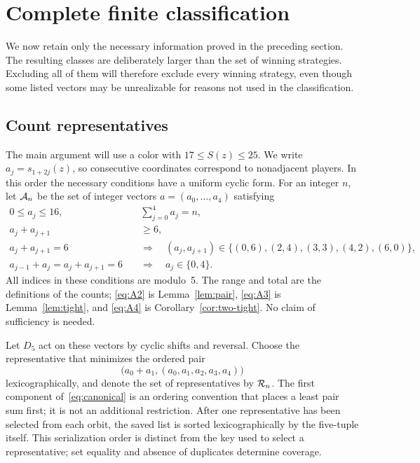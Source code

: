 \section{Complete finite classification}\label{sec:classification}
We now retain only the necessary information proved in the preceding
section. The resulting classes are deliberately larger than the set of
winning strategies. Excluding all of them will therefore exclude every
winning strategy, even though some listed vectors may be unrealizable
for reasons not used in the classification.
\subsection{Count representatives}
The main argument will use a color with $17\leq S(z)\leq25$.
We write $a_j=s_{1+2j}(z)$, so consecutive coordinates correspond to
nonadjacent players. In this order the necessary conditions have a uniform
cyclic form.
For an integer $n$, let $\mathcal{A}_n$ be the set of integer vectors
$a=(a_0,\ldots,a_4)$ satisfying
\begin{align}
0\leq a_j\leq16,\qquad&\sum_{j=0}^4a_j=n,\label{eq:A1}\\
a_j+a_{j+1}&\geq6,\label{eq:A2}\\
a_j+a_{j+1}=6\quad&\Longrightarrow\quad
(a_j,a_{j+1})\in\{(0,6),(2,4),(3,3),(4,2),(6,0)\},\label{eq:A3}\\
a_{j-1}+a_j=a_j+a_{j+1}=6\quad&\Longrightarrow\quad
a_j\in\{0,4\}.\label{eq:A4}
\end{align}
All indices in these conditions are modulo~5. The range and total are
the definitions of the counts; \eqref{eq:A2} is Lemma~\ref{lem:pair},
\eqref{eq:A3} is Lemma~\ref{lem:tight}, and \eqref{eq:A4} is
Corollary~\ref{cor:two-tight}. No claim of sufficiency is needed.

Let $D_5$ act on these vectors by cyclic shifts and reversal. Choose the
representative that minimizes the ordered pair
\begin{equation}\label{eq:canonical}
\bigl(a_0+a_1,(a_0,a_1,a_2,a_3,a_4)\bigr)
\end{equation}
lexicographically, and denote the set of representatives by $\mathcal{R}_n$.
The first component of~\eqref{eq:canonical} is an ordering convention
that places a least pair sum first; it is not an additional restriction.
After one representative has been selected from each orbit, the saved
list is sorted lexicographically by the five-tuple itself. This
serialization order is distinct from the key used to select a
representative; set equality and absence of duplicates determine coverage.


